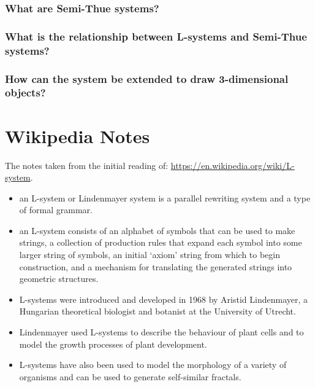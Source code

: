 \documentclass[11pt]{report}
\begin{document}
\subsection{What are Semi-Thue systems?}

\subsection{What is the relationship between L-systems and Semi-Thue systems?}

\subsection{How can the system be extended to draw 3-dimensional objects?}

\chapter{Wikipedia Notes}
The notes taken from the initial reading of:
\url{https://en.wikipedia.org/wiki/L-system}.
\begin{itemize}
    \item an L-system or Lindenmayer system is a parallel rewriting system and a type of
          formal grammar.
    \item an L-system consists of an alphabet of symbols that can be used to make
          strings, a collection of production rules that expand each symbol into some
          larger string of symbols, an initial `axiom' string from which to begin
          construction, and a mechanism for translating the generated strings into
          geometric structures.
    \item L-systems were introduced and developed in 1968 by Aristid Lindenmayer, a
          Hungarian theoretical biologist and botanist at the University of Utrecht.
    \item Lindenmayer used L-systems to describe the behaviour of plant cells and to
          model the growth processes of plant development.
    \item L-systems have also been used to model the morphology of a variety of organisms
          and can be used to generate self-similar fractals.
\end{itemize}

\clearpage
\printbibliography
\end{document}
